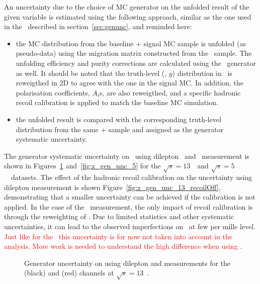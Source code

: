 \label{ss:ZpT_genUnc}
An uncertainty due to the choice of MC generator on the unfolded result of the given variable is estimated using the following approach, similar as the one used in the \Wboson\ described in section~\ref{sec:genunc}, and reminded here:
\begin{itemize}
\item the MC distribution from the baseline \POWHEG+ signal MC sample is unfolded (as pseudo-data) using the migration matrix constructed from the \Sherpa\ sample. The unfolding efficiency and purity corrections are calculated using the \Sherpa\ generator as well.
It should be noted that the truth-level (\ptz, $y$) distribution in \Sherpa\ is reweigthed in 2D to agree with the one in the signal MC. In addition, the polarisation coefficients, $A_i$s, are also reweigthed, and a specific hadronic recoil calibration is applied to match the baseline MC simulation.
\item the unfolded result is compared with the corresponding truth-level distribution from the same \POWHEG+ sample and assigned as the generator systematic uncertainty.

\end{itemize}

The generator systematic uncertainty on \ptz\ using dilepton \pt\ and \ut\ measurement is shown in Figures~\ref{fig:z_gen_unc_13} and~\ref{fig:z_gen_unc_5} for the $\sqrt{s} = 13$~\TeV\ and  $\sqrt{s} = 5$~\TeV\ datasets.
The effect of the hadronic recoil calibration on the uncertainty using dilepton \pt measurement is shown Figure~\ref{fig:z_gen_unc_13_recoilOff}, demonstrating that a smaller uncertainty can be achieved if the calibration is not applied.
In the case of the \ptll\ measurement, the only impact of recoil calibration is through the reweighting of \setue. Due to limited statistics and other systematic uncertainties, it can lead to the observed imperfections on \ptll\ at few per mille level.
\textcolor{red}{Just like for the \Wboson\, this uncertainty is for now not taken into account in the analysis. More work is needed to understand the high difference when using \SHERPA.}

\begin{figure}[h]
\centering
{}
\caption{Generator uncertainty on \ptz using dilepton \pt and \ut measurements for the \Zee (black) and \Zmm (red) channels at $\sqrt{s} = 13$~\TeV.}
\label{fig:z_gen_unc_13}
\end{figure}

